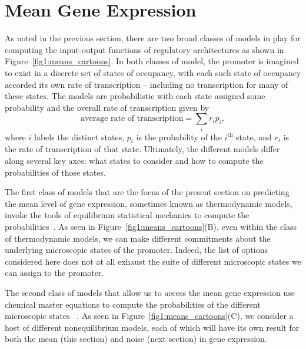 \section{Mean Gene Expression}\label{section_02_means}

As noted in the previous section, there are two broad classes of models in play
for computing the input-output functions of regulatory architectures as shown in
Figure~\ref{fig1:means_cartoons}. In both classes of model, the promoter is
imagined to exist in a discrete set of states of occupancy, with each such state
of occupancy accorded its own rate of transcription -- including no 
transcription for many of these states. The models are probabilistic with each
state assigned some probability and the overall rate of transcription given by 
\begin{equation}
\mbox{average rate of transcription} = \sum_i r_i p_i,
\label{eq:transcrip_prop_pbound}
\end{equation}
where $i$ labels the distinct states, $p_i$ is the probability of the
$i^{\text{th}}$ state, and $r_i$ is the rate of transcription of that state.
Ultimately, the different models differ along several key axes: what states to
consider and how to compute the probabilities of those states.

The first class of models that are the focus of the present section on
predicting the mean level of gene expression, sometimes known as thermodynamic
models, invoke the tools of equilibrium statistical mechanics to compute the
probabilities~\cite{Ackers1982, Shea1985, Buchler2003, Vilar2003a, Vilar2003b,
Bintu2005a, Bintu2005c, Gertz2009, Sherman2012, Saiz2013}. As seen in
Figure~\ref{fig1:means_cartoons}(B), even within the class of thermodynamic
models, we can make different commitments about the underlying microscopic
states of the promoter.  Indeed, the list of options considered here does not at
all exhaust the suite of different microscopic states we can assign to the
promoter.

The second class of models that allow us to access the mean gene expression use
chemical master equations to compute the probabilities of the different
microscopic states ~\cite{Ko1991, Peccoud1995, Record1996, Kepler2001,
Sanchez2008, Shahrezaei2008, Sanchez2011, Michel2010}. As seen in
Figure~\ref{fig1:means_cartoons}(C), we consider a host of different
nonequilibrium models, each of which will have its own result for both the mean
(this section) and noise (next section) in gene expression.

